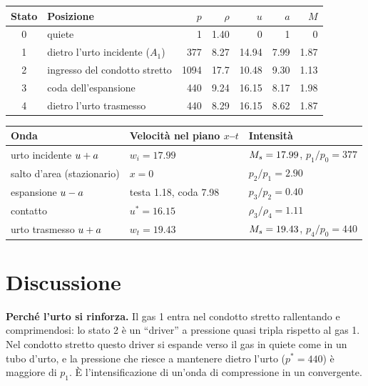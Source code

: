 \begin{table}[H]
  \centering
  \begin{tabular}{clrrrrr}
    \toprule
    Stato & Posizione & $p$ & $\rho$ & $u$ & $a$ & $M$ \\
    \midrule
    0 & quiete & 1 & \num{1.40} & 0 & 1 & 0 \\
    1 & dietro l'urto incidente ($A_1$) & \num{377} & \num{8.27} & \num{14.94} & \num{7.99} & \num{1.87} \\
    2 & ingresso del condotto stretto & \num{1094} & \num{17.7} & \num{10.48} & \num{9.30} & \num{1.13} \\
    3 & coda dell'espansione & \num{440} & \num{9.24} & \num{16.15} & \num{8.17} & \num{1.98} \\
    4 & dietro l'urto trasmesso & \num{440} & \num{8.29} & \num{16.15} & \num{8.62} & \num{1.87} \\
    \bottomrule
  \end{tabular}
\end{table}
\begin{table}[H]
  \centering
  \begin{tabular}{lll}
    \toprule
    Onda & Velocità nel piano $x$--$t$ & Intensità \\
    \midrule
    urto incidente $u+a$ & $w_i=\num{17.99}$ & $M_{s}=\num{17.99}$, $p_1/p_0=\num{377}$ \\
    salto d'area (stazionario) & $x=0$ & $p_2/p_1=\num{2.90}$ \\
    espansione $u-a$ & testa \num{1.18}, coda \num{7.98} & $p_3/p_2=\num{0.40}$ \\
    contatto & $u^*=\num{16.15}$ & $\rho_3/\rho_4=\num{1.11}$ \\
    urto trasmesso $u+a$ & $w_t=\num{19.43}$ & $M_{s}=\num{19.43}$, $p_4/p_0=\num{440}$ \\
    \bottomrule
  \end{tabular}
\end{table}

\section*{Discussione}
\textbf{Perché l'urto si rinforza.} Il gas 1 entra nel condotto stretto rallentando e comprimendosi: lo stato 2 è un
``driver'' a pressione quasi tripla rispetto al gas 1. Nel condotto stretto questo driver si espande verso il gas in
quiete come in un tubo d'urto, e la pressione che riesce a mantenere dietro l'urto ($p^*=\num{440}$) è maggiore di
$p_1$. È l'intensificazione di un'onda di compressione in un convergente.

